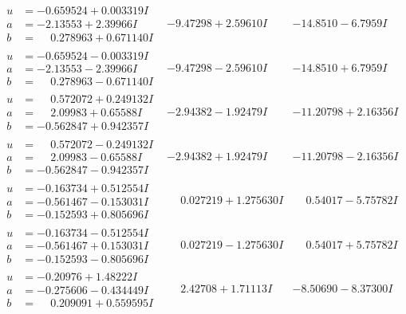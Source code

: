 \documentclass[1p]{elsarticle_modified}
\theoremstyle{definition}
\begin{document}
$$\begin{array}{c|c|c}
\begin{aligned}
u &= -0.659524 + 0.003319 I \\
a &= -2.13553 + 2.39966 I \\
b &= \phantom{-}0.278963 + 0.671140 I\end{aligned}
 & -9.47298 + 2.59610 I & -14.8510 - 6.7959 I \\ \hline\begin{aligned}
u &= -0.659524 - 0.003319 I \\
a &= -2.13553 - 2.39966 I \\
b &= \phantom{-}0.278963 - 0.671140 I\end{aligned}
 & -9.47298 - 2.59610 I & -14.8510 + 6.7959 I \\ \hline\begin{aligned}
u &= \phantom{-}0.572072 + 0.249132 I \\
a &= \phantom{-}2.09983 + 0.65588 I \\
b &= -0.562847 + 0.942357 I\end{aligned}
 & -2.94382 - 1.92479 I & -11.20798 + 2.16356 I \\ \hline\begin{aligned}
u &= \phantom{-}0.572072 - 0.249132 I \\
a &= \phantom{-}2.09983 - 0.65588 I \\
b &= -0.562847 - 0.942357 I\end{aligned}
 & -2.94382 + 1.92479 I & -11.20798 - 2.16356 I \\ \hline\begin{aligned}
u &= -0.163734 + 0.512554 I \\
a &= -0.561467 - 0.153031 I \\
b &= -0.152593 + 0.805696 I\end{aligned}
 & \phantom{-}0.027219 + 1.275630 I & \phantom{-}0.54017 - 5.75782 I \\ \hline\begin{aligned}
u &= -0.163734 - 0.512554 I \\
a &= -0.561467 + 0.153031 I \\
b &= -0.152593 - 0.805696 I\end{aligned}
 & \phantom{-}0.027219 - 1.275630 I & \phantom{-}0.54017 + 5.75782 I \\ \hline\begin{aligned}
u &= -0.20976 + 1.48222 I \\
a &= -0.275606 - 0.434449 I \\
b &= \phantom{-}0.209091 + 0.559595 I\end{aligned}
 & \phantom{-}2.42708 + 1.71113 I & -8.50690 - 8.37300 I \\ \hline\begin{aligned}

\end{aligned}
\end{array}$$
\end{document}

